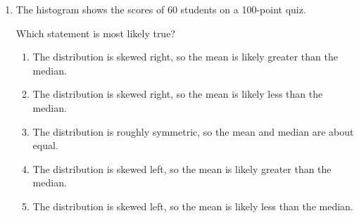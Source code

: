 \documentclass[12pt]{article}
\begin{document}
\begin{enumerate}[leftmargin=1.9em, itemsep=0.13in]
        What is the \textbf{interquartile range} of the temperatures?\hfill{}\rule[-0.2in]{0pt}{0.48in}
        \par\vspace{3pt}\noindent
        \hspace{1.2em}\textbf{(A)} 9 \hfill \textbf{(B)} 18 \hfill
        \textbf{(C)} 21 \hfill \textbf{(D)} 39 \hfill \textbf{(E)} 72

  \boxguard[18]
  \item The histogram shows the scores of 60 students on a 100-point quiz.

        \vspace{3pt}
        {\centering
        \par}
        \vspace{1pt}

        Which statement is most likely true?\hfill{}\rule[-0.2in]{0pt}{0.48in}
        \begin{enumerate}[label=\textbf{(\Alph*)}, leftmargin=2.2em, itemsep=2pt]
          \item The distribution is skewed right, so the mean is likely greater than the median.
          \item The distribution is skewed right, so the mean is likely less than the median.
          \item The distribution is roughly symmetric, so the mean and median are about equal.
          \item The distribution is skewed left, so the mean is likely greater than the median.
          \item The distribution is skewed left, so the mean is likely less than the median.
        \end{enumerate}


\end{enumerate}
\end{document}
